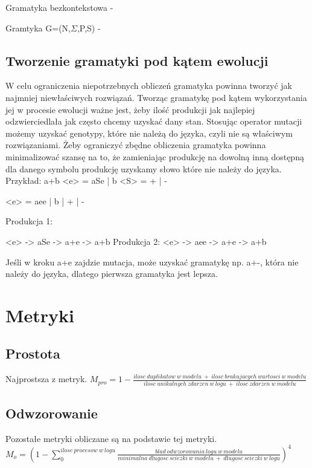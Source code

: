 Gramatyka bezkontekstowa - 

Gramtyka G=(N,$\Sigma$,P,S) - 

\subsection{Tworzenie gramatyki pod kątem ewolucji}

W celu ograniczenia niepotrzebnych obliczeń gramatyka powinna tworzyć jak najmniej niewłaściwych rozwiązań. 
Tworząc gramatykę pod kątem wykorzystania jej w procesie ewolucji ważne jest, żeby ilość produkcji jak najlepiej odzwierciedlała jak często chcemy uzyskać dany stan.
Stosując operator mutacji możemy uzyskać genotypy, które nie należą do języka, czyli nie są właściwym rozwiązaniami. Żeby ograniczyć zbędne obliczenia gramatyka powinna minimalizować szansę na to, że zamieniając produkcję na dowolną inną dostępną dla danego symbolu produkcję uzyskamy słowo które nie należy do języka.
Przykład:
a+b
<e> = aSe | b
<S> = + | -

<e> = aee | b | + | -

Produkcja 1:

<e> -> aSe -> a+e -> a+b
Produkcja 2:
<e> -> aee -> a+e -> a+b

Jeśli w kroku a+e zajdzie mutacja, może uzyskać gramatykę np. a+-, która nie należy do języka, dlatego pierwsza gramatyka jest lepsza.


\section{Metryki}
\label{sec:metryki}
\cite{doi:10.1142/S0218843014400012}
\subsection{Prostota}
Najprostsza z metryk. \newline
$M_{pro} = 1 - \frac{ilosc\ duplikatow\ w\ modelu\ +\ ilosc\ brakujacych\ wartosci\ w\ modelu}{ilosc\ unikalnych\ zdarzen\ w\ logu\ +\ ilosc\ zdarzen\ w\ modelu}$
\subsection{Odwzorowanie}
Pozostałe metryki obliczane są na podstawie tej metryki. \newline
$M_o = (1 - \sum_{0}^{ilosc\ procesow\ w\ logu} \frac{blad\ odwzorowania\ logu\ w\ modelu}{minimalna\ długosc\ sciezki\ w\ modelu\ +\ długosc\ sciezki\ w\ logu})^4$

